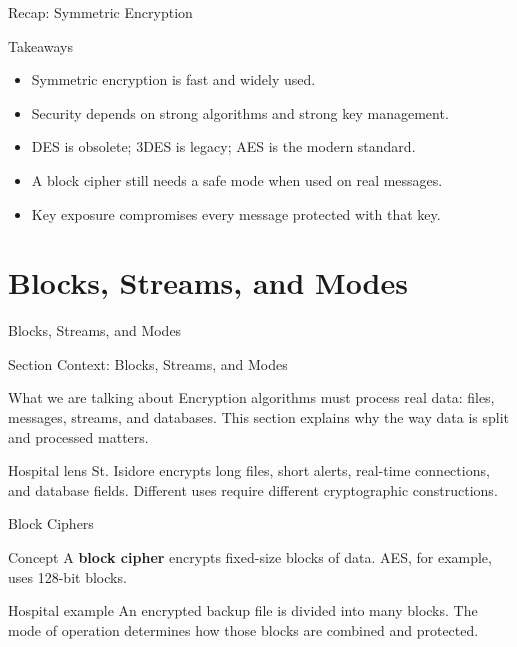 \documentclass[presentation]{beamer}
\newcommand{\sectiontitleframe}[1]{
\begin{frame}[plain,c]
\begin{center}
{\usebeamerfont{title}\usebeamercolor[fg]{title}#1}
\end{center}
\end{frame}
}
\begin{document}
\begin{frame}[c]{Recap: Symmetric Encryption}
\begin{block}{Takeaways}
\begin{itemize}
    \item Symmetric encryption is fast and widely used.
    \item Security depends on strong algorithms and strong key management.
    \item DES is obsolete; 3DES is legacy; AES is the modern standard.
    \item A block cipher still needs a safe mode when used on real messages.
    \item Key exposure compromises every message protected with that key.
\end{itemize}
\end{block}
\end{frame}

\section{Blocks, Streams, and Modes}
\sectiontitleframe{Blocks, Streams, and Modes}

\begin{frame}[c]{Section Context: Blocks, Streams, and Modes}
\begin{block}{What we are talking about}
Encryption algorithms must process real data: files, messages, streams, and databases. This
section explains why the way data is split and processed matters.
\end{block}

\begin{exampleblock}{Hospital lens}
St. Isidore encrypts long files, short alerts, real-time connections, and database fields. Different
uses require different cryptographic constructions.
\end{exampleblock}
\end{frame}

\begin{frame}[c]{Block Ciphers}
\begin{block}{Concept}
A \textbf{block cipher} encrypts fixed-size blocks of data. AES, for example, uses 128-bit blocks.
\end{block}

\begin{exampleblock}{Hospital example}
An encrypted backup file is divided into many blocks. The mode of operation determines how those
blocks are combined and protected.
\end{exampleblock}
\end{frame}
\end{document}
